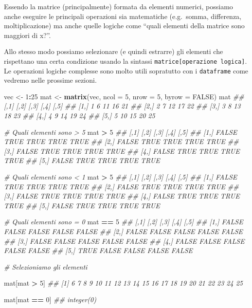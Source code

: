\documentclass[
]{book}
\newenvironment{Shaded}{\begin{snugshade}}{\end{snugshade}}
\newcommand{\CommentTok}[1]{\textcolor[rgb]{0.56,0.35,0.01}{\textit{#1}}}
\newcommand{\DataTypeTok}[1]{\textcolor[rgb]{0.13,0.29,0.53}{#1}}
\newcommand{\DecValTok}[1]{\textcolor[rgb]{0.00,0.00,0.81}{#1}}
\newcommand{\KeywordTok}[1]{\textcolor[rgb]{0.13,0.29,0.53}{\textbf{#1}}}
\newcommand{\NormalTok}[1]{#1}
\newcommand{\OperatorTok}[1]{\textcolor[rgb]{0.81,0.36,0.00}{\textbf{#1}}}
\newcommand{\OtherTok}[1]{\textcolor[rgb]{0.56,0.35,0.01}{#1}}
\newcommand{\StringTok}[1]{\textcolor[rgb]{0.31,0.60,0.02}{#1}}
\begin{document}
Essendo la matrice (principalmente) formata da elementi numerici, possiamo anche eseguire le principali operazioni sia matematiche (e.g.~somma, differenza, moltiplicazione) ma anche quelle logiche come ``quali elementi della matrice sono maggiori di x?''.

Allo stesso modo possiamo selezionare (e quindi estrarre) gli elementi che rispettano una certa condizione usando la sintassi \texttt{matrice{[}operazione\ logica{]}}. Le operazioni logiche complesse sono molto utili sopratutto con i \texttt{dataframe} come vedremo nelle prossime sezioni.

\begin{Shaded}
\begin{Highlighting}[]
\NormalTok{vec <-}\StringTok{ }\DecValTok{1}\OperatorTok{:}\DecValTok{25}
\NormalTok{mat <-}\StringTok{ }\KeywordTok{matrix}\NormalTok{(vec, }\DataTypeTok{ncol =} \DecValTok{5}\NormalTok{, }\DataTypeTok{nrow =} \DecValTok{5}\NormalTok{, }\DataTypeTok{byrow =} \OtherTok{FALSE}\NormalTok{)}
\NormalTok{mat}
\CommentTok{##      [,1] [,2] [,3] [,4] [,5]}
\CommentTok{## [1,]    1    6   11   16   21}
\CommentTok{## [2,]    2    7   12   17   22}
\CommentTok{## [3,]    3    8   13   18   23}
\CommentTok{## [4,]    4    9   14   19   24}
\CommentTok{## [5,]    5   10   15   20   25}

\CommentTok{# Quali elementi sono > 5}
\NormalTok{mat }\OperatorTok{>}\StringTok{ }\DecValTok{5}
\CommentTok{##       [,1] [,2] [,3] [,4] [,5]}
\CommentTok{## [1,] FALSE TRUE TRUE TRUE TRUE}
\CommentTok{## [2,] FALSE TRUE TRUE TRUE TRUE}
\CommentTok{## [3,] FALSE TRUE TRUE TRUE TRUE}
\CommentTok{## [4,] FALSE TRUE TRUE TRUE TRUE}
\CommentTok{## [5,] FALSE TRUE TRUE TRUE TRUE}

\CommentTok{# Quali elementi sono < 1}
\NormalTok{mat }\OperatorTok{>}\StringTok{ }\DecValTok{5}
\CommentTok{##       [,1] [,2] [,3] [,4] [,5]}
\CommentTok{## [1,] FALSE TRUE TRUE TRUE TRUE}
\CommentTok{## [2,] FALSE TRUE TRUE TRUE TRUE}
\CommentTok{## [3,] FALSE TRUE TRUE TRUE TRUE}
\CommentTok{## [4,] FALSE TRUE TRUE TRUE TRUE}
\CommentTok{## [5,] FALSE TRUE TRUE TRUE TRUE}

\CommentTok{# Quali elementi sono = 0}
\NormalTok{mat }\OperatorTok{==}\StringTok{ }\DecValTok{5}
\CommentTok{##       [,1]  [,2]  [,3]  [,4]  [,5]}
\CommentTok{## [1,] FALSE FALSE FALSE FALSE FALSE}
\CommentTok{## [2,] FALSE FALSE FALSE FALSE FALSE}
\CommentTok{## [3,] FALSE FALSE FALSE FALSE FALSE}
\CommentTok{## [4,] FALSE FALSE FALSE FALSE FALSE}
\CommentTok{## [5,]  TRUE FALSE FALSE FALSE FALSE}

\CommentTok{# Selezioniamo gli elementi}

\NormalTok{mat[mat }\OperatorTok{>}\StringTok{ }\DecValTok{5}\NormalTok{]}
\CommentTok{##  [1]  6  7  8  9 10 11 12 13 14 15 16 17 18 19 20 21 22 23 24 25}

\NormalTok{mat[mat }\OperatorTok{==}\StringTok{ }\DecValTok{0}\NormalTok{]}
\CommentTok{## integer(0)}
\end{Highlighting}
\end{Shaded}
\end{document}
